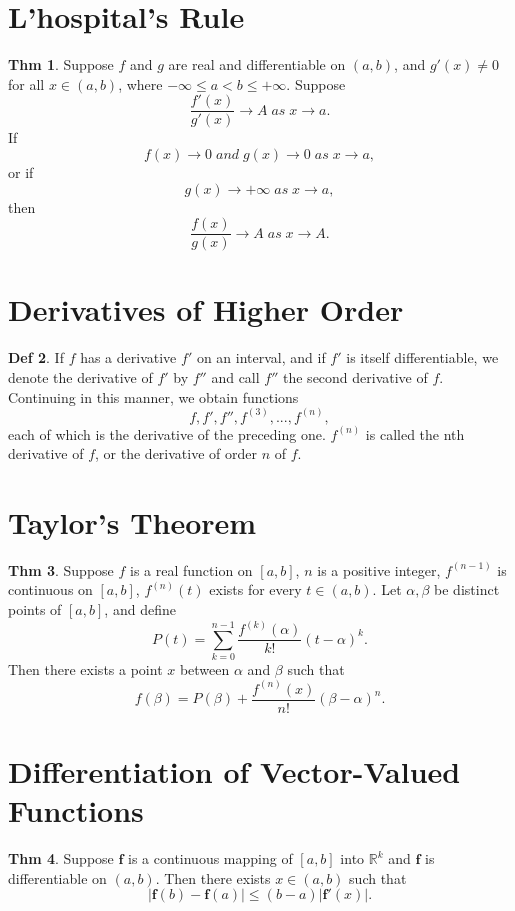 \documentclass{article}
\theoremstyle{definition}
\newtheorem{definition}{Def}
\newtheorem{theorem}[definition]{Thm}
\begin{document}
\section{L'hospital's Rule}
\begin{theorem}
    Suppose $f$ and $g$ are real and differentiable on $(a, b)$, and $g'(x)\neq 0$ for all $x\in (a, b)$, where $-\infty\leq a<b\leq +\infty$. Suppose
    \[
    \frac{f'(x)}{g'(x)}\to A \; as\; x\to a.
    \]
    If 
    \[
    f(x)\to 0\; and \;g(x)\to0 \; as\; x\to a,
    \]
    or if
    \[
    g(x)\to+\infty\; as \; x\to a,
    \]
    then
    \[
    \frac{f(x)}{g(x)}\to A\; as \; x\to A.
    \]
\end{theorem}

\section{Derivatives of Higher Order}
\begin{definition}
    If $f$ has a derivative $f'$ on an interval, and if $f'$ is itself differentiable, we denote the derivative of $f'$ by $f''$ and call $f''$ the second derivative of $f$.\\
    Continuing in this manner, we obtain functions
    \[
    f,f',f'',f^{(3)},...,f^{(n)},
    \]
    each of which is the derivative of the preceding one. $f^{(n)}$ is called the nth derivative of $f$, or the derivative of order $n$ of $f$.
\end{definition}

\section{Taylor's Theorem}
\begin{theorem}
    Suppose $f$ is a real function on $[a, b]$, $n$ is a positive integer, $f^{(n-1)}$ is continuous on $[a, b]$, $f^{(n)}(t)$ exists for every $t\in (a, b)$. Let $\alpha, \beta$ be distinct points of $[a, b]$, and define
    \[
    P(t)=\sum_{k=0}^{n-1} \frac{f^{(k)}(\alpha)}{k!}(t-\alpha)^k.
    \]
    Then there exists a point $x$ between $\alpha$ and $\beta$ such that
    \[
    f(\beta)=P(\beta)+\frac{f^{(n)}(x)}{n!}(\beta-\alpha)^n.
    \]
\end{theorem}

\section{Differentiation of Vector-Valued Functions}
\begin{theorem}
    Suppose $\mathbf{f}$ is a continuous mapping of $[a, b]$ into $\mathbb{R}^k$ and $\mathbf{f}$ is differentiable on $(a, b)$. Then there exists $x\in (a, b)$ such that
    \[
    |\mathbf{f}(b)-\mathbf{f}(a)| \leq (b-a)|\mathbf{f}'(x)|.
    \]
\end{theorem}
\end{document}
